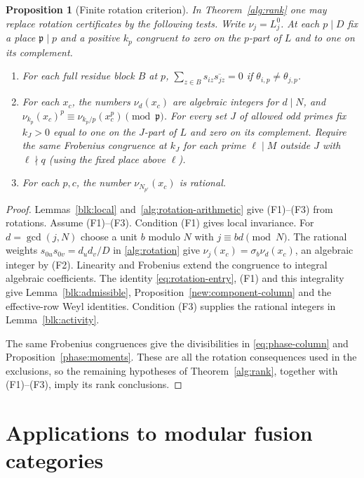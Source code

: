 \documentclass[11pt]{amsart}
\numberwithin{equation}{section}
\newtheorem{proposition}[theorem]{Proposition}
\theoremstyle{definition}
\theoremstyle{plain}
\begin{document}
\begin{proposition}[Finite rotation criterion]\label{formal:criterion}
In Theorem~\ref{alg:rank} one may replace rotation certificates by the
following tests. Write $\nu_j=L_j^0$. At each $p\mid D$ fix a place
$\mathfrak p\mid p$ and a positive $k_p$ congruent to zero on the
$p$-part of $L$ and to one on its complement.
\begin{enumerate}[label=\textup{(F\arabic*)},leftmargin=3em]
\item For each full residue block $B$ at $p$,
$\sum_{z\in B}s_{iz}\overline{s_{jz}}=0$ if
$\theta_{i,p}\ne\theta_{j,p}$.
\item For each $x_c$, the numbers $\nu_d(x_c)$ are algebraic integers
for $d\mid N$, and
$\nu_{k_p}(x_c)^p\equiv\nu_{k_p/p}(x_c^p)\pmod{\mathfrak p}$.
For every set $J$ of allowed odd primes fix $k_J>0$ equal to one
on the $J$-part of $L$ and zero on its complement. Require the same
Frobenius congruence at $k_J$ for each prime $\ell\mid M$ outside
$J$ with $\ell\nmid q$ (using the fixed place above $\ell$).
\item For each $p,c$, the number $\nu_{N_{p'}}(x_c)$ is rational.
\end{enumerate}
\end{proposition}
\begin{proof}
Lemmas~\ref{blk:local} and~\ref{alg:rotation-arithmetic} give (F1)--(F3)
from rotations. Assume (F1)--(F3). Condition (F1) gives local invariance.
For $d=\gcd(j,N)$
choose a unit $b$ modulo $N$ with $j\equiv bd\pmod N$. The rational
weights $s_{0u}s_{0v}=d_ud_v/D$ in \eqref{alg:rotation} give
$\nu_j(x_c)=\sigma_b\nu_d(x_c)$, an algebraic integer by (F2).
Linearity and Frobenius extend the congruence to integral algebraic
coefficients. The identity \eqref{eq:rotation-entry}, (F1) and this integrality
give Lemma~\ref{blk:admissible}, Proposition~\ref{new:component-column}
and the effective-row Weyl identities. Condition (F3) supplies the
rational integers in Lemma~\ref{blk:activity}.

The same Frobenius congruences give the divisibilities in
\eqref{eq:phase-column} and Proposition~\ref{phase:moments}.
These are all the rotation consequences used in the exclusions, so
the remaining hypotheses of Theorem~\ref{alg:rank}, together with
(F1)--(F3), imply its rank conclusions.
\end{proof}

\section{Applications to modular fusion categories}\label{ext:classification}
\end{document}

